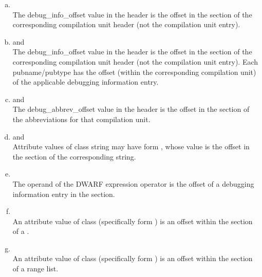 \clearpage
\begin{enumerate}[(a)]  
\item  {}  \\
The debug\_info\_offset value in
the header is
the offset in the  section of the
corresponding compilation unit header (not the compilation
unit entry).

\item {} and  \\
The debug\_info\_offset value in the header is the offset in the
 section of the 
corresponding compilation unit header (not
the compilation unit entry). Each pubname/pubtype has the offset (within
the corresponding compilation unit) of the applicable debugging
information entry.

\item {} and  \\
The debug\_abbrev\_offset value in the header is the offset in the
section of the abbreviations for that compilation unit.

\item  {} and  \\
Attribute values of class string may have form , whose
value is the offset in the 
section of the corresponding string.

\item {} \\
The operand of the  DWARF expression operator is the
offset of a debugging information entry in the 
 section.

\item {} \\
An attribute value of class  (specifically form
) is an offset within the  
section of a
.

\item {} \\
An attribute value of class  (specifically form
) is an offset within the  section of
a range list.


\end{enumerate}
